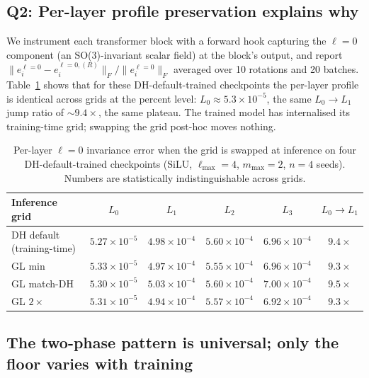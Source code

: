 \documentclass{article}
\begin{document}
\subsection{Q2: Per-layer profile preservation explains why}

We instrument each transformer block with a forward hook capturing
the $\ell{=}0$ component (an SO(3)-invariant scalar field) at the
block's output, and report
$\|e_i^{\ell{=}0} - e_i^{\ell{=}0,(R)}\|_F /
   \|e_i^{\ell{=}0}\|_F$ averaged over 10 rotations and 20 batches.
Table~\ref{tab:dropin_perlayer} shows that for these
DH-default-trained checkpoints the per-layer profile is identical
across grids at the percent level: $L_0 \approx 5.3 \times 10^{-5}$,
the same $L_0 \to L_1$ jump ratio of $\sim$$9.4\times$, the same
plateau. The trained model has internalised its training-time grid;
swapping the grid post-hoc moves nothing.

\begin{table}[t]
  \centering
  \caption{Per-layer $\ell{=}0$ invariance error when the grid is
  swapped at inference on four DH-default-trained checkpoints (SiLU,
  $\ell_{\max}{=}4$, $m_{\max}{=}2$, $n=4$ seeds). Numbers are
  statistically indistinguishable across grids.}
  \label{tab:dropin_perlayer}
  \small
  \begin{tabular}{lcccc c}
    \toprule
    Inference grid & $L_0$ & $L_1$ & $L_2$ & $L_3$ & $L_0 \!\to\! L_1$ \\
    \midrule
    DH default (training-time) & $5.27 \!\times\!10^{-5}$ & $4.98\!\times\!10^{-4}$ & $5.60\!\times\!10^{-4}$ & $6.96\!\times\!10^{-4}$ & $9.4\times$ \\
    GL min                     & $5.33 \!\times\!10^{-5}$ & $4.97\!\times\!10^{-4}$ & $5.55\!\times\!10^{-4}$ & $6.96\!\times\!10^{-4}$ & $9.3\times$ \\
    GL match-DH                & $5.30 \!\times\!10^{-5}$ & $5.03\!\times\!10^{-4}$ & $5.60\!\times\!10^{-4}$ & $7.00\!\times\!10^{-4}$ & $9.5\times$ \\
    GL $2\times$               & $5.31 \!\times\!10^{-5}$ & $4.94\!\times\!10^{-4}$ & $5.57\!\times\!10^{-4}$ & $6.92\!\times\!10^{-4}$ & $9.3\times$ \\
    \bottomrule
  \end{tabular}
\end{table}

\subsection{The two-phase pattern is universal; only the floor
varies with training}
\end{document}
